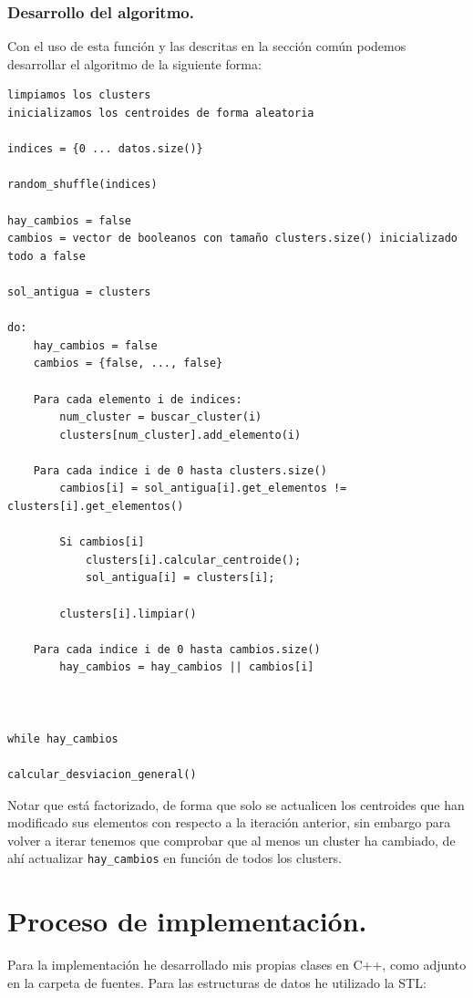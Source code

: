 \documentclass[12pt, spanish]{article}
\begin{document}
\subsubsection{Desarrollo del algoritmo.}

Con el uso de esta función y las descritas en la sección común podemos desarrollar el algoritmo de la siguiente forma:

\begin{lstlisting}
limpiamos los clusters
inicializamos los centroides de forma aleatoria

indices = {0 ... datos.size()}

random_shuffle(indices)

hay_cambios = false
cambios = vector de booleanos con tamaño clusters.size() inicializado todo a false

sol_antigua = clusters

do:
	hay_cambios = false
	cambios = {false, ..., false}
	
	Para cada elemento i de indices:
		num_cluster = buscar_cluster(i)
		clusters[num_cluster].add_elemento(i)
		
	Para cada indice i de 0 hasta clusters.size()
		cambios[i] = sol_antigua[i].get_elementos != clusters[i].get_elementos()
		
		Si cambios[i]
			clusters[i].calcular_centroide();
			sol_antigua[i] = clusters[i];
			
		clusters[i].limpiar()
		
	Para cada indice i de 0 hasta cambios.size()
		hay_cambios = hay_cambios || cambios[i]



while hay_cambios

calcular_desviacion_general()

\end{lstlisting}

Notar que está factorizado, de forma que solo se actualicen los centroides que han modificado sus elementos con respecto a la iteración anterior, sin embargo para volver a iterar tenemos que comprobar que al menos un cluster ha cambiado, de ahí actualizar \texttt{hay\_cambios} en función de todos los clusters.

\section{Proceso de implementación.}

Para la implementación he desarrollado mis propias clases en C++, como adjunto en la carpeta de fuentes. Para las estructuras de datos he utilizado la STL:
\end{document}
